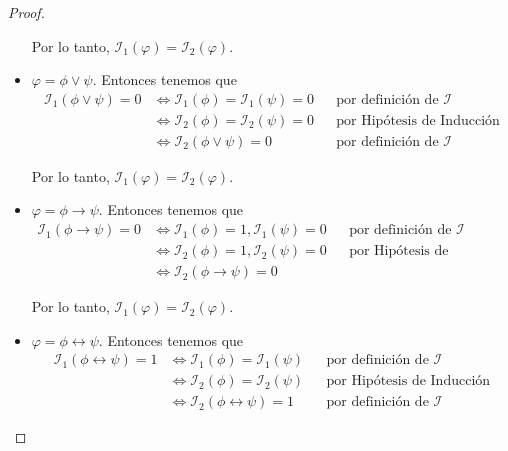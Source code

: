 \documentclass[letterpaper,11pt]{article}
\begin{document}
\begin{proof}
\begin{itemize}
            Por lo tanto, 
            $\mathcal{I}_{1}(\varphi) = \mathcal{I}_{2}(\varphi)$.

            \item $\varphi = \phi \lor \psi$. Entonces tenemos que 
            \begin{align*}
                \mathcal{I}_{1}(\phi \lor \psi) = 0
                &\Leftrightarrow \mathcal{I}_{1}(\phi) = \mathcal{I}_{1}(\psi)
                = 0
                && \text{por definición de $\mathcal{I}$} \\
                &\Leftrightarrow \mathcal{I}_{2}(\phi) = \mathcal{I}_{2}(\psi)
                = 0
                && \text{por Hipótesis de Inducción} \\
                &\Leftrightarrow \mathcal{I}_{2}(\phi \lor \psi) = 0
                && \text{por definición de $\mathcal{I}$} 
            \end{align*}

            Por lo tanto, 
            $\mathcal{I}_{1}(\varphi) = \mathcal{I}_{2}(\varphi)$.

            \item $\varphi = \phi \rightarrow \psi$. Entonces tenemos que 
            \begin{align*}
                \mathcal{I}_{1}(\phi \rightarrow \psi) = 0
                &\Leftrightarrow \mathcal{I}_{1}(\phi) = 1,
                \mathcal{I}_{1}(\psi) = 0
                && \text{por definición de $\mathcal{I}$} \\
                &\Leftrightarrow \mathcal{I}_{2}(\phi) = 1, 
                \mathcal{I}_{2}(\psi) = 0
                && \text{por Hipótesis de Inducción} \\
                &\Leftrightarrow \mathcal{I}_{2}(\phi \rightarrow \psi) = 0
            \end{align*}

            Por lo tanto, 
            $\mathcal{I}_{1}(\varphi) = \mathcal{I}_{2}(\varphi)$.

            \item $\varphi = \phi \leftrightarrow \psi$. Entonces tenemos que
            \begin{align*}
                \mathcal{I}_{1}(\phi \leftrightarrow \psi) = 1
                &\Leftrightarrow \mathcal{I}_{1}(\phi) = \mathcal{I}_{1}(\psi)
                && \text{por definición de $\mathcal{I}$} \\
                &\Leftrightarrow \mathcal{I}_{2}(\phi) = \mathcal{I}_{2}(\psi)
                && \text{por Hipótesis de Inducción} \\
                &\Leftrightarrow \mathcal{I}_{2}(\phi \leftrightarrow \psi) = 1
                && \text{por definición de $\mathcal{I}$}
            \end{align*}


\end{itemize}
\end{proof}
\end{document}
